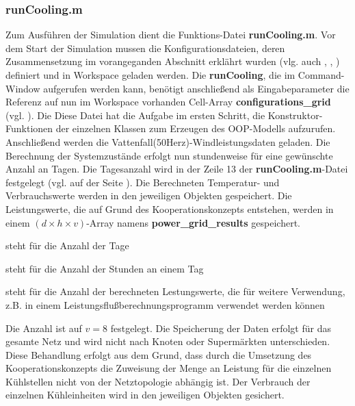 \subsubsection*{runCooling.m}
Zum Ausf\"uhren der Simulation dient die \matlab Funktions-Datei
\textbf{runCooling.m}. Vor dem Start der Simulation mussen die
Konfigurationsdateien, deren Zusammensetzung im vorangeganden Abschnitt
erkl\"ahrt wurden (vlg. auch , ,
) definiert und in \matlab Workspace geladen werden. Die
\textbf{runCooling}, die im \matlab Command-Window aufgerufen werden kann,
ben\"otigt anschlie\ss end als Eingabeparameter die Referenz auf nun im \matlab
Workspace vorhanden Cell-Array \textbf{configurations\_grid} (vgl.
). Die Diese Datei hat die Aufgabe im ersten Schritt, die
Konstruktor-Funktionen der einzelnen Klassen zum Erzeugen des OOP-Modells
aufzurufen. Anschlie\ss end werden die Vattenfall(50Herz)-Windleistungsdaten
geladen. Die Berechnung der Systemzust\"ande erfolgt nun stundenweise f\"ur eine
gew\"unschte Anzahl an Tagen. Die Tagesanzahl wird in der Zeile 13 der
\textbf{runCooling.m}-Datei festgelegt (vgl.  auf der Seite
\pageref{configf}). Die Berechneten Temperatur- und Verbrauchswerte werden in
den jeweiligen Objekten gespeichert. Die Leistungswerte, die auf Grund des
Kooperationskonzepts entstehen, werden in einem $( d \times h \times
v)$-Array namens \textbf{power\_grid\_results} gespeichert.
\begin{description}[\dth]
\item[$d$] steht f\"ur die Anzahl der Tage
\item[$h$] steht f\"ur die Anzahl der Stunden an einem Tag
\item[$v$] steht f\"ur die Anzahl der berechneten Lestungswerte, die f\"ur
weitere Verwendung, z.B. in einem Leistungsflu\ss berechnungsprogramm verwendet
werden k\"onnen
\end{description}
Die Anzahl ist auf $v = 8$ festgelegt. Die Speicherung der Daten erfolgt f\"ur
das gesamte Netz und wird nicht nach Knoten oder Superm\"arkten unterschieden.
Diese Behandlung erfolgt aus dem Grund, dass durch die Umsetzung des
Kooperationskonzepts die Zuweisung der Menge an Leistung f\"ur die einzelnen
K\"uhlstellen nicht von der Netztopologie abh\"angig ist. Der Verbrauch der
einzelnen K\"uhleinheiten wird in den jeweiligen Objekten gesichert.

